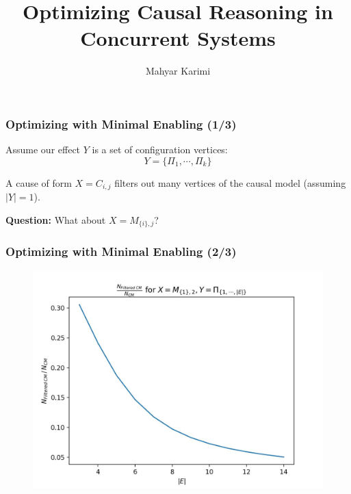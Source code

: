 \documentclass{beamer}
\title{Optimizing Causal Reasoning in Concurrent Systems}
\author{Mahyar Karimi}
\begin{document}
\frame{\maketitle}

\begin{frame}
\frametitle{Optimizing with Minimal Enabling (1/3)}

Assume our effect $Y$ is a set of configuration vertices:
\[ Y = \{ \Pi_1, \cdots, \Pi_k \} \]

A cause of form $X = C_{i, j}$ filters out many vertices of the causal model
(assuming $|Y| = 1$).

\textbf{Question:} What about $X = M_{ \{i\}, j }$?
\end{frame}

\begin{frame}
\frametitle{Optimizing with Minimal Enabling (2/3)}

\begin{figure}
\centering
\includegraphics[scale=0.5]{plt/plt_m12_pi_all.jpg}
\end{figure}
\end{frame}
\end{document}
